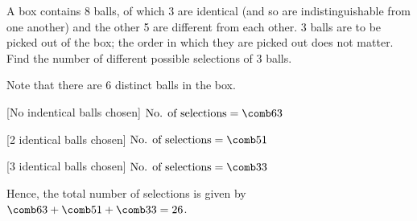 \begin{problem}
    A box contains 8 balls, of which 3 are identical (and so are indistinguishable from one another) and the other 5 are different from each other. 3 balls are to be picked out of the box; the order in which they are picked out does not matter. Find the number of different possible selections of 3 balls.
\end{problem}
\begin{solution}
    Note that there are 6 distinct balls in the box.

    [No indentical balls chosen] $\text{No. of selections} = \comb63$

    [2 identical balls chosen] $\text{No. of selections} = \comb51$

    [3 identical balls chosen] $\text{No. of selections} = \comb33$

    Hence, the total number of selections is given by $\comb63 + \comb51 + \comb33 = 26$.
\end{solution}

